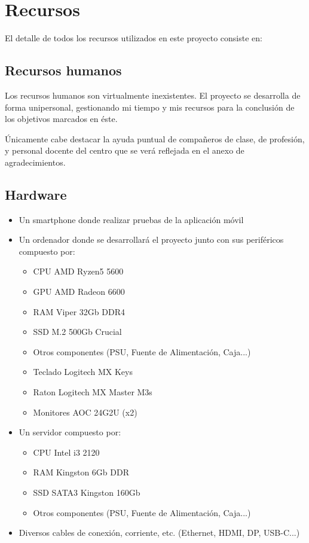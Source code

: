 \documentclass{article}
\begin{document}


\newpage
\section{Recursos}
\label{sec:Resources}

\noindent El detalle de todos los recursos utilizados en este proyecto consiste en:
\subsection{Recursos humanos}
\label{sec:HumanRes}

Los recursos humanos son virtualmente inexistentes. El proyecto se desarrolla de forma unipersonal, gestionando mi tiempo y mis recursos para la conclusión de los objetivos marcados en éste.

Únicamente cabe destacar la ayuda puntual de compañeros de clase, de profesión, y personal docente del centro que se verá reflejada en el anexo de agradecimientos.

\subsection{Hardware}
\begin{itemize}
	\item Un smartphone donde realizar pruebas de la aplicación móvil
	\item Un ordenador donde se desarrollará el proyecto junto con sus periféricos compuesto por:
	\begin{itemize}
    	\item CPU AMD Ryzen5 5600
    	\item GPU AMD Radeon 6600
    	\item RAM Viper 32Gb DDR4
    	\item SSD M.2 500Gb Crucial
    	\item Otros componentes (PSU, Fuente de Alimentación, Caja...)
    	\item Teclado Logitech MX Keys
    	\item Raton Logitech MX Master M3s
    	\item Monitores AOC 24G2U (x2)
	\end{itemize}
	\item Un servidor compuesto por:
	\begin{itemize}
    	\item CPU Intel i3 2120
    	\item RAM Kingston 6Gb DDR
    	\item SSD SATA3 Kingston 160Gb
    	\item Otros componentes (PSU, Fuente de Alimentación, Caja...)
	\end{itemize}
	\item Diversos cables de conexión, corriente, etc. (Ethernet, HDMI, DP, USB-C...)
\end{itemize}
\end{document}

